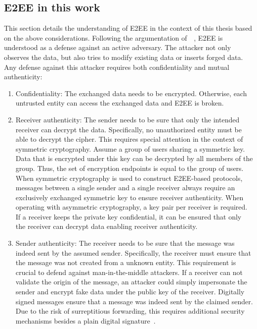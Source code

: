 \documentclass[../main.tex]{subfiles}
\begin{document}
\subsection{E2EE in this work}
This section details the understanding of E2EE in the context of this thesis based on the above considerations.
Following the argumentation of~\citeauthor{Hale2022}~\cite{Hale2022}, E2EE is understood as a defense against an active adversary.
The attacker not only observes the data, but also tries to modify existing data or inserts forged data.
Any defense against this attacker requires both confidentiality and mutual authenticity:
\begin{enumerate}
    \item Confidentiality: 
    The exchanged data needs to be encrypted. 
    Otherwise, each untrusted entity can access the exchanged data and E2EE is broken.
    \item Receiver authenticity:
    The sender needs to be sure that only the intended receiver can decrypt the data.
    Specifically, no unauthorized entity must be able to decrypt the cipher.
    This requires special attention in the context of symmetric cryptography.
    Assume a group of users sharing a symmetric key.
    Data that is encrypted under this key can be decrypted by all members of the group.
    Thus, the set of encryption endpoints is equal to the group of users.
    When symmetric cryptography is used to construct E2EE-based protocols, messages between a single sender and a single receiver always require an exclusively exchanged symmetric key to ensure receiver authenticity.
    When operating with asymmetric cryptography, a key pair per receiver is required.
    If a receiver keeps the private key confidential, it can be ensured that only the receiver can decrypt data enabling receiver authenticity.
    \item Sender authenticity: 
    The receiver needs to be sure that the message was indeed sent by the assumed sender.
    Specifically, the receiver must ensure that the message was not created from a unknown entity.
    This requirement is crucial to defend against man-in-the-middle attackers.
    If a receiver can not validate the origin of the message, an attacker could simply impersonate the sender and encrypt fake data under the public key of the receiver.
    Digitally signed messages ensure that a message was indeed sent by the claimed sender.
    Due to the risk of surreptitious forwarding, this requires additional security mechanisms besides a plain digital signature~\cite{Davis2001}.
\end{enumerate}
\end{document}
